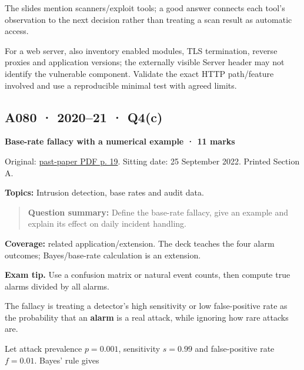 \documentclass[11pt,a4paper]{article}
\begin{document}
The slides mention scanners/\allowbreak{}exploit tools; a good answer connects each tool's observation to the next decision rather than treating a scan result as automatic access.


For a web server,\allowbreak{} also inventory enabled modules,\allowbreak{} TLS termination,\allowbreak{} reverse proxies and application versions; the externally visible Server header may not identify the vulnerable component. Validate the exact HTTP path/\allowbreak{}feature involved and use a reproducible minimal test with agreed limits.




\clearpage
\subsection{A080 · 2020–21 · Q4(c)}\label{a080}

\textbf{Base-rate fallacy with a numerical example · 11 marks}


Original: \href{../../CSE405-Security_Merged.pdf\#page=19}{past-paper PDF p. 19}. Sitting date: 25 September 2022. Printed Section A.


\textbf{Topics:} Intrusion detection,\allowbreak{} base rates and audit data.



\begin{quote}\small

\textbf{Question summary:} Define the base-rate fallacy,\allowbreak{} give an example and explain its effect on daily incident handling.



\end{quote}

\textbf{Coverage:} related application/\allowbreak{}extension. The deck teaches the four alarm outcomes; Bayes/\allowbreak{}base-rate calculation is an extension.



{\color{ForestGreen}\textbf{Exam tip.} Use a confusion matrix or natural event counts,\allowbreak{} then compute true alarms divided by all alarms.}


The fallacy is treating a detector's high sensitivity or low false-positive rate as the probability that an \textbf{alarm} is a real attack,\allowbreak{} while ignoring how rare attacks are.


Let attack prevalence \(p=0.001\),\allowbreak{} sensitivity \(s=0.99\) and false-positive rate \(f=0.01\). Bayes' rule gives
\end{document}
